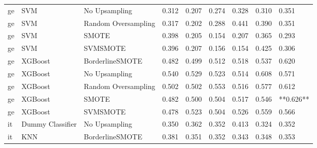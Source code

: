 \begin{tabular}{lllllllll}
      ge &                          SVM &       No Upsampling & 0.312 &                     0.207 &                 0.274 &                  0.328 &                                   0.310 &     0.351 \\
      ge &                          SVM & Random Oversampling & 0.317 &                     0.202 &                 0.288 &                  0.441 &                                   0.390 &     0.351 \\
      ge &                          SVM &               SMOTE & 0.398 &                     0.205 &                 0.154 &                  0.207 &                                   0.365 &     0.293 \\
      ge &                          SVM &            SVMSMOTE & 0.396 &                     0.207 &                 0.156 &                  0.154 &                                   0.425 &     0.306 \\
      ge &                      XGBoost &     BorderlineSMOTE & 0.482 &                     0.499 &                 0.512 &                  0.518 &                                   0.537 &     0.620 \\
      ge &                      XGBoost &       No Upsampling & 0.540 &                     0.529 &                 0.523 &                  0.514 &                                   0.608 &     0.571 \\
      ge &                      XGBoost & Random Oversampling & 0.502 &                     0.502 &                 0.553 &                  0.516 &                                   0.577 &     0.612 \\
      ge &                      XGBoost &               SMOTE & 0.482 &                     0.500 &                 0.504 &                  0.517 &                                   0.546 & **0.626** \\
      ge &                      XGBoost &            SVMSMOTE & 0.478 &                     0.523 &                 0.504 &                  0.526 &                                   0.559 &     0.566 \\
      it &             Dummy Classifier &       No Upsampling & 0.350 &                     0.362 &                 0.352 &                  0.413 &                                   0.324 &     0.352 \\
      it &                          KNN &     BorderlineSMOTE & 0.381 &                     0.351 &                 0.352 &                  0.343 &                                   0.348 &     0.353 \\

\end{tabular}
